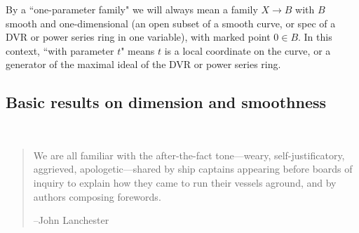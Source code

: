 By a ``one-parameter family" we will always mean a family $X \to B$ with $B$ smooth and one-dimensional (an open subset of a smooth curve, or spec of a DVR or power series ring in one variable), with marked point $0 \in B$. In this context, ``with parameter $t$" means $t$ is a local coordinate on the curve, or a generator of the maximal ideal of the DVR or power series ring.


\subsection{Basic results on dimension and smoothness}



\newpage

\

\begin{quote}
\small\sf
We are all familiar with the after-the-fact tone---weary, self-justificatory, aggrieved, apologetic---shared by ship captains appearing before boards of inquiry to explain how they came to run their vessels aground, and by authors composing forewords.

--John Lanchester 
\bigskip

\end{quote}



\



